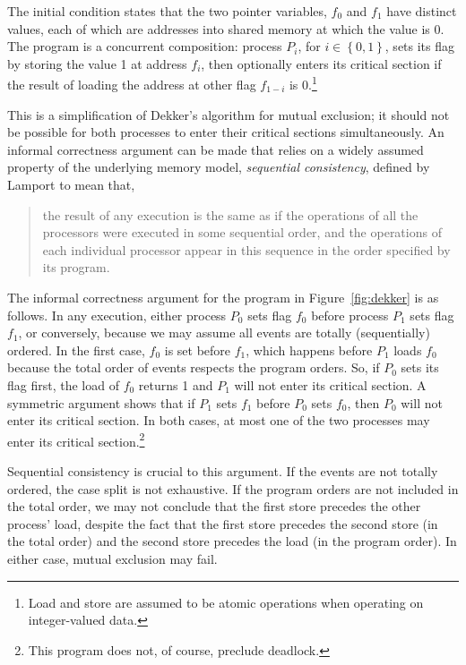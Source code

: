\documentclass[11pt]{report}         %
\begin{document}
The initial condition states that the two pointer variables, $f_0$ and $f_1$ have distinct values, each of which are addresses into shared memory at which the value is 0. The program is a concurrent composition: process $P_i$, for $i \in \left\lbrace 0,1 \right\rbrace$, sets its flag by storing the value 1 at address $f_i$, then optionally enters its critical section if the result of loading the address at other flag $f_{1-i}$ is 0.\footnote{Load and store are assumed to be atomic operations when operating on integer-valued data.}

This is a simplification of Dekker's algorithm for mutual exclusion; it should not be possible for both processes to enter their critical sections simultaneously. An informal correctness argument can be made that relies on a widely assumed property of the underlying memory model, \emph{sequential consistency}, defined by Lamport \cite{DBLP:journals/tc/Lamport79} to mean that, \begin{quotation}\noindent the result of any execution is the same as if the operations of all the processors were executed in some sequential order, and the operations of each individual processor appear in this sequence in the order specified by its program. \end{quotation}

The informal correctness argument for the program in Figure~\ref{fig:dekker} is as follows. In any execution, either process $P_0$ sets flag $f_0$ before process $P_1$ sets flag $f_1$, or conversely, because we may assume all events are totally (sequentially) ordered. In the first case, $f_0$ is set before $f_1$, which happens before $P_1$ loads $f_0$ because the total order of events respects the program orders. So, if $P_0$ sets its flag first, the load of $f_0$ returns 1 and $P_1$ will not enter its critical section. A symmetric argument shows that if $P_1$ sets $f_1$ before $P_0$ sets $f_0$, then $P_0$ will not enter its critical section. In both cases, at most one of the two processes may enter its critical section.\footnote{This program does not, of course, preclude deadlock.}

Sequential consistency is crucial to this argument. If the events are not totally ordered, the case split is not exhaustive. If the program orders are not included in the total order, we may not conclude that the first store precedes the other process' load, despite the fact that the first store precedes the second store (in the total order) and the second store precedes the load (in the program order). In either case, mutual exclusion may fail.
\end{document}
